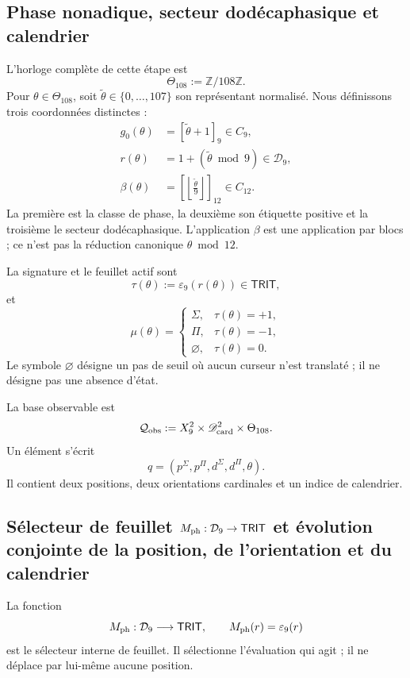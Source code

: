 {\subsection{Phase nonadique, secteur dodécaphasique et calendrier}

L’horloge complète de cette étape est
\[
 \Theta_{108}:=\mathbb Z/108\mathbb Z.
\]
Pour \(\theta\in\Theta_{108}\), soit
\(\widetilde\theta\in\{0,\ldots,107\}\) son représentant normalisé.
Nous définissons trois coordonnées distinctes :
\begin{align*}
 g_0(\theta)&=[\widetilde\theta+1]_9\in C_9,\\
 r(\theta)&=1+(\widetilde\theta\bmod9)\in\mathcal D_9,\\
 \beta(\theta)&=
 \left[\left\lfloor\frac{\widetilde\theta}{9}\right\rfloor\right]_{12}
 \in C_{12}.
\end{align*}
La première est la classe de phase, la deuxième son étiquette positive et la troisième
le secteur dodécaphasique. L’application \(\beta\) est une application par blocs ;
ce n’est pas la réduction canonique \(\theta\bmod12\).

La signature et le feuillet actif sont
\[
 \tau(\theta):=\varepsilon_9(r(\theta))\in\mathsf{TRIT},
\]
et
\[
 \mu(\theta)=
 \begin{cases}
  \Sigma,&\tau(\theta)=+1,\\
  \Pi,&\tau(\theta)=-1,\\
  \varnothing,&\tau(\theta)=0.
 \end{cases}
\]
Le symbole \(\varnothing\) désigne un pas de seuil où aucun curseur
n’est translaté ; il ne désigne pas une absence d’état.

\begin{definition}
\label{p12-83-c1-s3:def:tpk-configuracion-observable}
La base observable est
\[
 \mathcal Q_{\rm obs}
 :=X_9^2\times\mathscr D_{\rm card}^2\times\Theta_{108}.
\]
Un élément s’écrit
\[
 q=(p^\Sigma,p^\Pi,d^\Sigma,d^\Pi,\theta).
\]
Il contient deux positions, deux orientations cardinales et un indice de
calendrier.
\end{definition}

\subsection{Sélecteur de feuillet \(M_{\rm ph}:\mathcal D_9\to\mathsf{TRIT}\) et évolution conjointe de la position, de l’orientation et du calendrier}

La fonction
\[
 M_{\rm ph}:\mathcal D_9\longrightarrow\mathsf{TRIT},
 \qquad M_{\rm ph}(r)=\varepsilon_9(r)
\]
est le sélecteur interne de feuillet. Il sélectionne l’évaluation qui agit ; il ne déplace
par lui-même aucune position.

}
